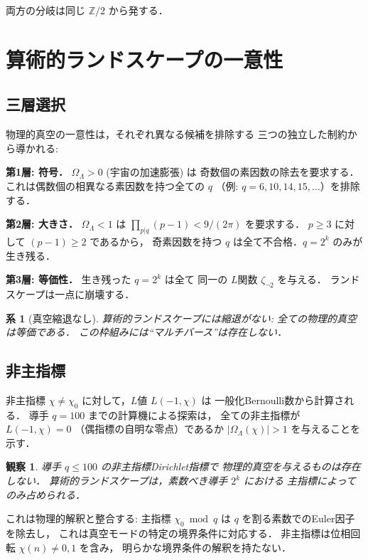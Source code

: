 \documentclass[11pt,a4paper]{article}
\newtheorem{corollary}{系}
\newtheorem{observation}{観察}
\begin{document}
両方の分岐は同じ $\mathbb{Z}/2$ から発する．

\section{算術的ランドスケープの一意性}

\subsection{三層選択}

物理的真空の一意性は，それぞれ異なる候補を排除する
三つの独立した制約から導かれる:

\textbf{第1層: 符号．} $\Omega_\Lambda > 0$ (宇宙の加速膨張) は
奇数個の素因数の除去を要求する．
これは偶数個の相異なる素因数を持つ全ての $q$
（例: $q = 6, 10, 14, 15, \ldots$）を排除する．

\textbf{第2層: 大きさ．} $\Omega_\Lambda < 1$ は
$\prod_{p|q}(p-1) < 9/(2\pi)$ を要求する．
$p \geq 3$ に対して $(p-1) \geq 2$ であるから，
奇素因数を持つ $q$ は全て不合格．$q = 2^k$ のみが生き残る．

\textbf{第3層: 等価性．} 生き残った $q = 2^k$ は全て
同一の $L$関数 $\zeta_{\neg 2}$ を与える．
ランドスケープは一点に崩壊する．

\begin{corollary}[真空縮退なし]
算術的ランドスケープには縮退がない: 全ての物理的真空は等価である．
この枠組みには``マルチバース''は存在しない．
\end{corollary}

\subsection{非主指標}

非主指標 $\chi \neq \chi_0$ に対して，$L$値 $L(-1, \chi)$ は
一般化Bernoulli数から計算される．
導手 $q = 100$ までの計算機による探索は，
全ての非主指標が $L(-1, \chi) = 0$
（偶指標の自明な零点）であるか
$|\Omega_\Lambda(\chi)| > 1$ を与えることを示す．

\begin{observation}
導手 $q \leq 100$ の非主指標Dirichlet指標で
物理的真空を与えるものは存在しない．
算術的ランドスケープは，素数べき導手 $2^k$ における
主指標によってのみ占められる．
\end{observation}

これは物理的解釈と整合する:
主指標 $\chi_0 \bmod q$ は $q$ を割る素数でのEuler因子を除去し，
これは真空モードの特定の境界条件に対応する．
非主指標は位相回転 $\chi(n) \neq 0, 1$ を含み，
明らかな境界条件の解釈を持たない．
\end{document}

